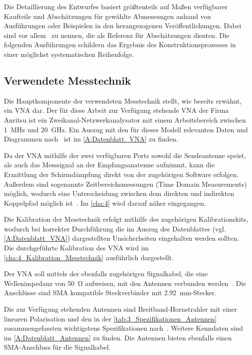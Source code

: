 
Die Detaillierung des Entwurfes basiert größtenteils auf Maßen verfügbarer Kaufteile und Abschätzungen für gewählte Abmessungen anhand von Ausführungen oder Beispielen in den herangezogenen Veröffentlichungen. Dabei sind vor allem~\cite{Design_of_shielded_enclosures, EMV-gerechtes_Geraetedesign, EM_Schirmung, Simplified_shielding, Handbook_Shielding_Materials_and_Performance} zu nennen, die als Referenz für Abschätzungen dienten. Die folgenden Ausführungen schildern das Ergebnis des Konstruktionsprozesses in einer möglichst systematischen Reihenfolge.

\subsection{Verwendete Messtechnik}

Die Hauptkomponente der verwendeten Messtechnik stellt, wie bereits erwähnt, ein \ac{VNA} dar. Der für diese Arbeit zur Verfügung stehende \ac{VNA} der Firma Anritsu ist ein Zweikanal-Netzwerkanalysator mit einem Arbeitsbereich zwischen \SI{1}{\mega\hertz} und \SI{20}{\giga\hertz}. Ein Auszug mit den für dieses Modell relevanten Daten und Diagrammen nach~\cite{VNA-Datenblatt} ist im \Anhang\ref{A:Datenblatt_VNA} zu finden. 
\par
\vspace{\linespace}
Da der \ac{VNA} mithilfe der zwei verfügbaren Ports sowohl die Sendeantenne speist, als auch das Messsignal an der Empfangsanatenne aufnimmt, kann die Ermittlung der Schirmdämpfung direkt von der zugehörigen Software erfolgen. Außerdem sind sogenannte Zeitbereichsmessungen (Time Domain Measurements) möglich, wodurch eine Unterscheidung zwischen dem direkten und indirekten Koppelpfad möglich ist~\cite{Techniques_Shielding_Effectiveness_Far_Field_Simulation}. Im \Kapitel\ref{cha:4} wird darauf näher eingegangen.
\par
\vspace{\linespace}
Die Kalibration der Messtechnik erfolgt mithilfe des zugehörigen Kalibrationskits, wodurch bei korrekter Durchführung die im Auszug des Datenblattes (vgl. \Anhang\ref{A:Datenblatt_VNA}) dargestellten Unsicherheiten eingehalten werden sollten. Die durchgeführte Kalibration des \ac{VNA} wird im \Abschnitt\ref{cha:4_Kalibration_Messtechnik} ausführlich dargestellt.
\par
\vspace{\linespace}
Der \ac{VNA} soll mittels der ebenfalls zugehörigen Signalkabel, die eine Wellenimpedanz von \SI{50}{\ohm} aufweisen, mit den Antennen verbunden werden~\cite{Testkabel_VNA-Datenblatt}. Die Anschlüsse sind \ac{SMA} kompatible Steckverbinder mit \SI{2,92}{\milli\meter}-Stecker.
\par
\vspace{\linespace}
Die zur Verfügung stehenden Antennen sind Breitband-Hornstrahler mit einer linearen Polarisation und den in der \Tabelle\ref{tab:3_Spezifikationen_Antennen} zusammengefassten wichtigstens Spezifikationen nach~\cite{Antennen-Datenblatt}. Weitere Kenndaten sind im \Anhang\ref{A:Datenblatt_Antennen} zu finden. Die Antennen bieten ebenfalls einen SMA-Anschluss für die Signalkabel.

